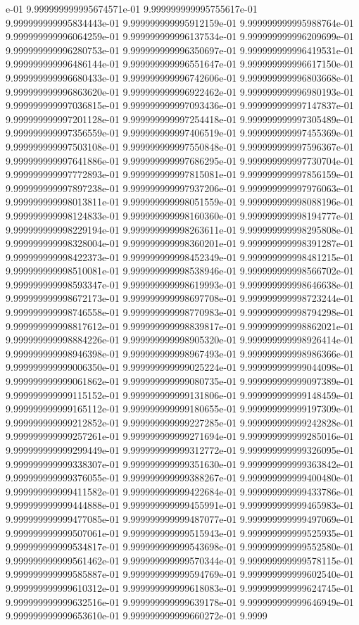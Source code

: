 e-01	9.999999999995674571e-01	9.999999999995755617e-01	9.999999999995834443e-01	9.999999999995912159e-01	9.999999999995988764e-01	9.999999999996064259e-01	9.999999999996137534e-01	9.999999999996209699e-01	9.999999999996280753e-01	9.999999999996350697e-01	9.999999999996419531e-01	9.999999999996486144e-01	9.999999999996551647e-01	9.999999999996617150e-01	9.999999999996680433e-01	9.999999999996742606e-01	9.999999999996803668e-01	9.999999999996863620e-01	9.999999999996922462e-01	9.999999999996980193e-01	9.999999999997036815e-01	9.999999999997093436e-01	9.999999999997147837e-01	9.999999999997201128e-01	9.999999999997254418e-01	9.999999999997305489e-01	9.999999999997356559e-01	9.999999999997406519e-01	9.999999999997455369e-01	9.999999999997503108e-01	9.999999999997550848e-01	9.999999999997596367e-01	9.999999999997641886e-01	9.999999999997686295e-01	9.999999999997730704e-01	9.999999999997772893e-01	9.999999999997815081e-01	9.999999999997856159e-01	9.999999999997897238e-01	9.999999999997937206e-01	9.999999999997976063e-01	9.999999999998013811e-01	9.999999999998051559e-01	9.999999999998088196e-01	9.999999999998124833e-01	9.999999999998160360e-01	9.999999999998194777e-01	9.999999999998229194e-01	9.999999999998263611e-01	9.999999999998295808e-01	9.999999999998328004e-01	9.999999999998360201e-01	9.999999999998391287e-01	9.999999999998422373e-01	9.999999999998452349e-01	9.999999999998481215e-01	9.999999999998510081e-01	9.999999999998538946e-01	9.999999999998566702e-01	9.999999999998593347e-01	9.999999999998619993e-01	9.999999999998646638e-01	9.999999999998672173e-01	9.999999999998697708e-01	9.999999999998723244e-01	9.999999999998746558e-01	9.999999999998770983e-01	9.999999999998794298e-01	9.999999999998817612e-01	9.999999999998839817e-01	9.999999999998862021e-01	9.999999999998884226e-01	9.999999999998905320e-01	9.999999999998926414e-01	9.999999999998946398e-01	9.999999999998967493e-01	9.999999999998986366e-01	9.999999999999006350e-01	9.999999999999025224e-01	9.999999999999044098e-01	9.999999999999061862e-01	9.999999999999080735e-01	9.999999999999097389e-01	9.999999999999115152e-01	9.999999999999131806e-01	9.999999999999148459e-01	9.999999999999165112e-01	9.999999999999180655e-01	9.999999999999197309e-01	9.999999999999212852e-01	9.999999999999227285e-01	9.999999999999242828e-01	9.999999999999257261e-01	9.999999999999271694e-01	9.999999999999285016e-01	9.999999999999299449e-01	9.999999999999312772e-01	9.999999999999326095e-01	9.999999999999338307e-01	9.999999999999351630e-01	9.999999999999363842e-01	9.999999999999376055e-01	9.999999999999388267e-01	9.999999999999400480e-01	9.999999999999411582e-01	9.999999999999422684e-01	9.999999999999433786e-01	9.999999999999444888e-01	9.999999999999455991e-01	9.999999999999465983e-01	9.999999999999477085e-01	9.999999999999487077e-01	9.999999999999497069e-01	9.999999999999507061e-01	9.999999999999515943e-01	9.999999999999525935e-01	9.999999999999534817e-01	9.999999999999543698e-01	9.999999999999552580e-01	9.999999999999561462e-01	9.999999999999570344e-01	9.999999999999578115e-01	9.999999999999585887e-01	9.999999999999594769e-01	9.999999999999602540e-01	9.999999999999610312e-01	9.999999999999618083e-01	9.999999999999624745e-01	9.999999999999632516e-01	9.999999999999639178e-01	9.999999999999646949e-01	9.999999999999653610e-01	9.999999999999660272e-01	9.9999